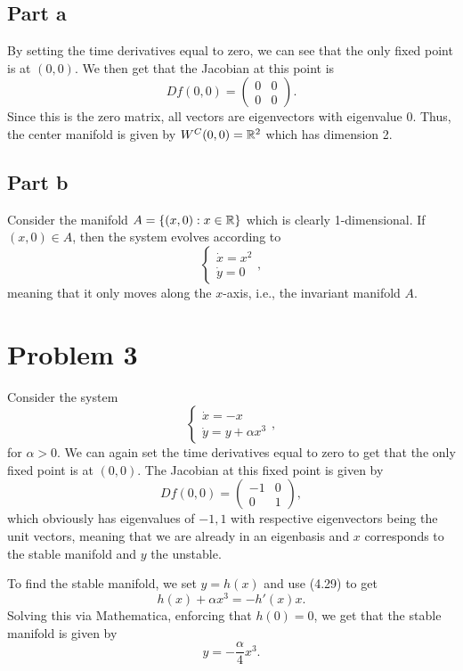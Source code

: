 \documentclass{article}
\begin{document}
\subsection{Part a}
By setting the time derivatives equal to zero, we can see that the only fixed point is at $(0,0)$. We then get that the Jacobian at this point is
\[
Df(0,0)=\begin{pmatrix}
	0&0\\0&0
\end{pmatrix}.
\]
Since this is the zero matrix, all vectors are eigenvectors with eigenvalue $0$. Thus, the center manifold is given by $W^C(0,0)=\mathbb{R}^2$ which has dimension 2.
\subsection{Part b}
Consider the manifold $A=\{(x,0):x\in\mathbb{R}\}$ which is clearly 1-dimensional. If $(x,0)\in A$, then the system evolves according to
\begin{equation*}
	\left\{\begin{array}{l}
		\dot x= x^2  \\
		\dot y = 0 
	\end{array}\right.,
\end{equation*}
meaning that it only moves along the $x$-axis, i.e., the invariant manifold $A$.

\section{Problem 3}
Consider the system 
\begin{equation*}
	\left\{\begin{array}{l}
		\dot x= -x \\
		\dot y = y + \alpha x^3 
	\end{array}\right.,
\end{equation*}
for $\alpha>0$. We can again set the time derivatives equal to zero to get that the only fixed point is at $(0,0)$. The Jacobian at this fixed point is given by
\[
Df(0,0)=\begin{pmatrix}
	-1&0\\
	0&1
\end{pmatrix},
\]
which obviously has eigenvalues of $-1,1$ with respective eigenvectors being the unit vectors, meaning that we are already in an eigenbasis and $x$ corresponds to the stable manifold and $y$ the unstable. 

To find the stable manifold, we set $y=h(x)$ and use (4.29) to get
\[
h(x) + \alpha x^3=-h'(x)x.
\]
Solving this via Mathematica, enforcing that $h(0)=0$, we get that the stable manifold is given by 
\[
y=-\frac{\alpha}{4}x^3.
\]
\end{document}
